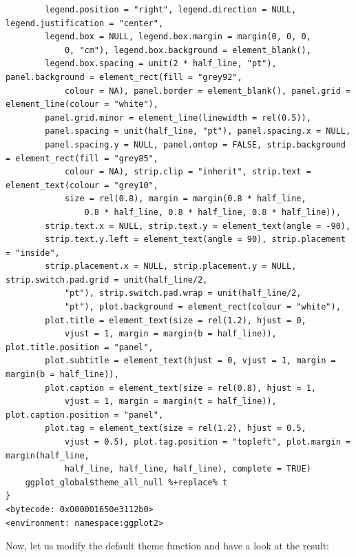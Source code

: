\documentclass[
  letterpaper,
  DIV=11,
  numbers=noendperiod]{scrreprt}
\begin{document}
\begin{verbatim}
        legend.position = "right", legend.direction = NULL, legend.justification = "center", 
        legend.box = NULL, legend.box.margin = margin(0, 0, 0, 
            0, "cm"), legend.box.background = element_blank(), 
        legend.box.spacing = unit(2 * half_line, "pt"), panel.background = element_rect(fill = "grey92", 
            colour = NA), panel.border = element_blank(), panel.grid = element_line(colour = "white"), 
        panel.grid.minor = element_line(linewidth = rel(0.5)), 
        panel.spacing = unit(half_line, "pt"), panel.spacing.x = NULL, 
        panel.spacing.y = NULL, panel.ontop = FALSE, strip.background = element_rect(fill = "grey85", 
            colour = NA), strip.clip = "inherit", strip.text = element_text(colour = "grey10", 
            size = rel(0.8), margin = margin(0.8 * half_line, 
                0.8 * half_line, 0.8 * half_line, 0.8 * half_line)), 
        strip.text.x = NULL, strip.text.y = element_text(angle = -90), 
        strip.text.y.left = element_text(angle = 90), strip.placement = "inside", 
        strip.placement.x = NULL, strip.placement.y = NULL, strip.switch.pad.grid = unit(half_line/2, 
            "pt"), strip.switch.pad.wrap = unit(half_line/2, 
            "pt"), plot.background = element_rect(colour = "white"), 
        plot.title = element_text(size = rel(1.2), hjust = 0, 
            vjust = 1, margin = margin(b = half_line)), plot.title.position = "panel", 
        plot.subtitle = element_text(hjust = 0, vjust = 1, margin = margin(b = half_line)), 
        plot.caption = element_text(size = rel(0.8), hjust = 1, 
            vjust = 1, margin = margin(t = half_line)), plot.caption.position = "panel", 
        plot.tag = element_text(size = rel(1.2), hjust = 0.5, 
            vjust = 0.5), plot.tag.position = "topleft", plot.margin = margin(half_line, 
            half_line, half_line, half_line), complete = TRUE)
    ggplot_global$theme_all_null %+replace% t
}
<bytecode: 0x000001650e3112b0>
<environment: namespace:ggplot2>
\end{verbatim}

Now, let us modify the default theme function and have a look at the
result:
\end{document}
